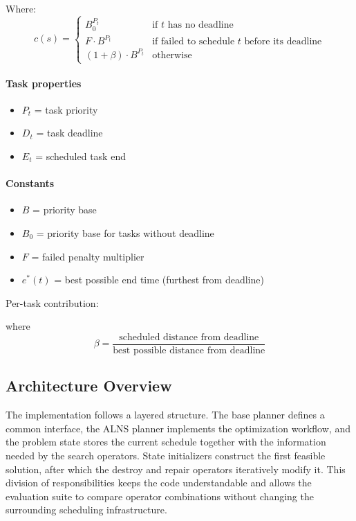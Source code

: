 \documentclass{article}
\begin{document}
Where:
\begin{equation*}
c(s)=
\begin{cases}
B_0^{P_t} & \text{if }t \text{ has no deadline}\\[4pt]
F\cdot B^{P_t} & \text{if failed to schedule }t\text{ before its deadline}\\[4pt]
(1 + \beta) \cdot B^{P_t}& \text{otherwise}
\end{cases}
\end{equation*}

\paragraph{Task properties}
\begin{itemize}
\item $P_t$ = task priority
\item $D_t$ = task deadline
\item $E_t$ = scheduled task end
\end{itemize}

\paragraph{Constants}
\begin{itemize}
\item $B$ = priority base
\item $B_0$ = priority base for tasks without deadline
\item $F$ = failed penalty multiplier
\item $e^*(t)$ = best possible end time (furthest from deadline)
\end{itemize}

Per-task contribution:

where
\begin{equation*}
\beta = \frac{\text{scheduled distance from deadline}}{\text{best possible distance from deadline}}
\end{equation*}

\subsection{Architecture Overview}
The implementation follows a layered structure. The base planner defines a common interface, the ALNS planner implements the optimization workflow, and the problem state stores the current schedule together with the information needed by the search operators. State initializers construct the first feasible solution, after which the destroy and repair operators iteratively modify it. This division of responsibilities keeps the code understandable and allows the evaluation suite to compare operator combinations without changing the surrounding scheduling infrastructure.
\end{document}
